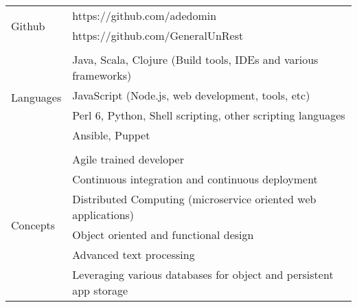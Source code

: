 \documentclass[10pt,letterpaper,]{article}
\begin{document}
\begin{center}
\begin{tabular}{l|l}
    \multirow{2}{*}{Github} & https://github.com/adedomin \\
                            & https://github.com/GeneralUnRest \\
    \\
    \multirow{4}{*}{Languages} & Java, Scala, Clojure (Build tools, IDEs and various frameworks) \\
                               & JavaScript (Node.js, web development, tools, etc) \\
                               & Perl 6, Python, Shell scripting, other scripting languages \\
                               & Ansible, Puppet \\
    \\
    \multirow{6}{*}{Concepts} & Agile trained developer \\
                              & Continuous integration and continuous deployment \\
                              & Distributed Computing (microservice oriented web applications) \\
                              & Object oriented and functional design \\
                              & Advanced text processing \\
                              & Leveraging various databases for object and persistent app storage \\
\end{tabular}
\end{center}
\end{document}
